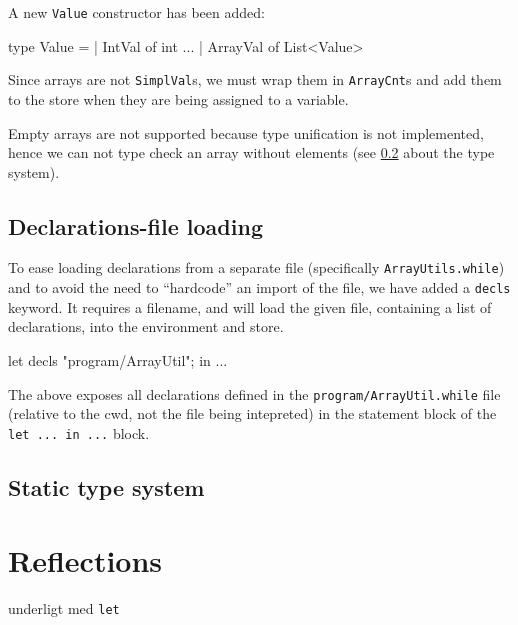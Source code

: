 \documentclass{article}
\begin{document}
A new {\tt Value} constructor has been added:
\begin{fs}
type Value    = | IntVal of int
                ...
                | ArrayVal of List<Value>
\end{fs}

Since arrays are not {\tt SimplVal}s, we must wrap them in {\tt ArrayCnt}s and add them to the store when they are being assigned to a variable.

Empty arrays are not supported because type unification is not implemented, hence we can not type check an array without elements (see \ref{sec:type} about the type system).

\subsection{Declarations-file loading}

To ease loading declarations from a separate file (specifically {\tt ArrayUtils.while}) and to avoid the need to ``hardcode'' an import of the file, we have added a {\tt decls} keyword. It requires a filename, and will load the given file, containing a list of declarations, into the environment and store.

\begin{fs}
let decls "program/ArrayUtil"; in ...
\end{fs}

The above exposes all declarations defined in the {\tt program/ArrayUtil.while} file (relative to the cwd, not the file being intepreted) in the statement block of the {\tt let ... in ...} block.

\subsection{Static type system}
\label{sec:type}


\section{Reflections}
underligt med {\tt let}
\end{document}
